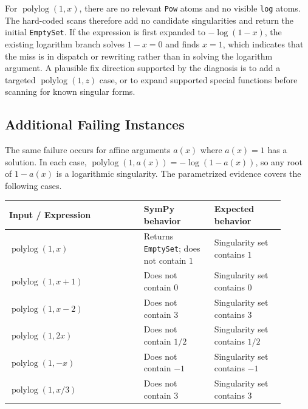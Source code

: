 \documentclass[11pt]{article}
\begin{document}
For \(\operatorname{polylog}(1,x)\), there are no relevant \texttt{Pow} atoms and no visible \texttt{log} atoms.  The hard-coded scans therefore add no candidate singularities and return the initial \texttt{EmptySet}.  If the expression is first expanded to \(-\log(1-x)\), the existing logarithm branch solves \(1-x=0\) and finds \(x=1\), which indicates that the miss is in dispatch or rewriting rather than in solving the logarithm argument.  A plausible fix direction supported by the diagnosis is to add a targeted \(\operatorname{polylog}(1,z)\) case, or to expand supported special functions before scanning for known singular forms.

\subsection{Additional Failing Instances}

The same failure occurs for affine arguments \(a(x)\) where \(a(x)=1\) has a solution.  In each case, \(\operatorname{polylog}(1,a(x))=-\log(1-a(x))\), so any root of \(1-a(x)\) is a logarithmic singularity.  The parametrized evidence covers the following cases.

\begin{center}
\renewcommand{\arraystretch}{1.3}
\begin{tabular}{@{}>{\raggedright\arraybackslash}p{0.44\linewidth}>{\raggedright\arraybackslash}p{0.23\linewidth}>{\raggedright\arraybackslash}p{0.23\linewidth}@{}}
\toprule
\textbf{Input / Expression} & \textbf{SymPy behavior} & \textbf{Expected behavior} \\
\midrule
\(\operatorname{polylog}(1,x)\) & Returns \texttt{EmptySet}; does not contain \(1\) & Singularity set contains \(1\) \\
\(\operatorname{polylog}(1,x+1)\) & Does not contain \(0\) & Singularity set contains \(0\) \\
\(\operatorname{polylog}(1,x-2)\) & Does not contain \(3\) & Singularity set contains \(3\) \\
\(\operatorname{polylog}(1,2x)\) & Does not contain \(1/2\) & Singularity set contains \(1/2\) \\
\(\operatorname{polylog}(1,-x)\) & Does not contain \(-1\) & Singularity set contains \(-1\) \\
\(\operatorname{polylog}(1,x/3)\) & Does not contain \(3\) & Singularity set contains \(3\) \\
\bottomrule
\end{tabular}
\end{center}
\end{document}
